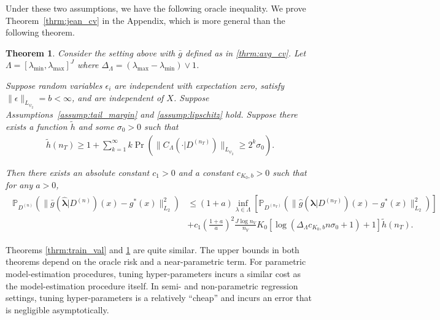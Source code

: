 \documentclass[12pt]{article} %
\newtheorem{theorem}{Theorem}
\theoremstyle{definition}
\begin{document}
Under these two assumptions, we have the following oracle inequality.
We prove Theorem~\ref{thrm:jean_cv} in the Appendix, which is more general than the following theorem.
\begin{theorem}
	\label{thrm:kfold}
	Consider the setting above with $\bar{g}$ defined as in \eqref{thrm:avg_cv}.
	Let $\Lambda=[\lambda_{\min},\lambda_{\max}]^{J}$ where $\Delta_{\Lambda} = (\lambda_{\max} - \lambda_{\min}) \vee 1$.

	Suppose random variables $\epsilon_i$ are independent with expectation zero, satisfy $\|\epsilon\|_{L_{\psi_2}}= b <\infty$, and are independent of $X$.
	Suppose Assumptions~\ref{assump:tail_margin} and \ref{assump:lipschitz} hold.
	Suppose there exists a function $\tilde{h}$ and some $\sigma_0 > 0$ such that
	\begin{align}
	\tilde{h}(n_{T})
	\ge
	1 + \sum_{k=1}^{\infty}
	k\Pr\left(\|C_\Lambda(\cdot |D^{(n_{T})})\|_{L_{\psi_{2}}}\ge2^{k}\sigma_{0}\right).
	\end{align}

	Then there exists an absolute constant $c_{1}>0$ and a constant $c_{K_0, b}>0$ such that for any $a > 0$,
	\begin{align}
	\begin{split}
	\mathbb{P}_{D^{(n)}}\left(
	\|
	\bar{g}(\hat{\boldsymbol{\lambda}}|D^{(n)})(x)
	-g^{*}(x)
	\|_{L_{2}}^{2}\right)
	& \le	(1+a)
	\inf_{\lambda\in\Lambda}
	\left[\mathbb{P}_{D^{(n_{T})}}\left(\|\hat{g}(\boldsymbol{\lambda}|D^{(n_{T})})(x)-g^{*}(x)\|_{L_{2}}^{2}\right)\right] \\
	& +
	c_{1}
	\left (\frac{1+a}{a} \right )^2
	\frac{J\log n_{V}}{n_{V}}
	K_0
	\left[\log\left(\Delta_{\Lambda} c_{K_0, b} n \sigma_0 +1\right)+1\right]
	\tilde{h}(n_{T}).
	\end{split}
	\label{eq:cv_lipschitz_oracle_ineq}
	\end{align}
\end{theorem}

Theorems \ref{thrm:train_val} and \ref{thrm:kfold} are quite similar. The upper bounds in both theorems depend on the oracle risk and a near-parametric term. For parametric model-estimation procedures, tuning hyper-parameters incurs a similar cost as the model-estimation procedure itself. In semi- and non-parametric regression settings, tuning hyper-parameters is a relatively ``cheap'' and incurs an error that is negligible asymptotically.
\end{document}
